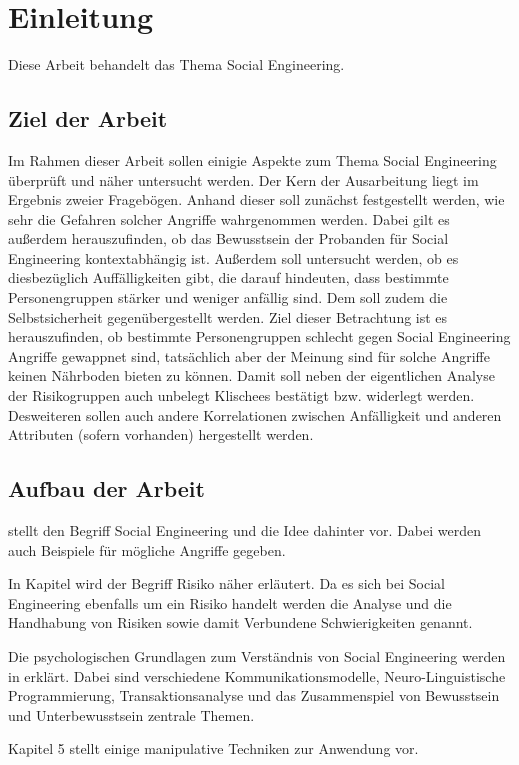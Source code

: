\section{Einleitung}\label{sec:2_einleitung}
Diese Arbeit behandelt das Thema Social Engineering.

\subsection{Ziel der Arbeit}\label{sec:ziel_der_arbeit}
Im Rahmen dieser Arbeit sollen einigie Aspekte zum Thema Social Engineering überprüft und näher untersucht werden.
Der Kern der Ausarbeitung liegt im Ergebnis zweier Fragebögen.
Anhand dieser soll zunächst festgestellt werden, wie sehr die Gefahren solcher Angriffe wahrgenommen werden.
Dabei gilt es außerdem herauszufinden, ob das Bewusstsein der Probanden für Social Engineering kontextabhängig ist.
Außerdem soll untersucht werden, ob es diesbezüglich Auffälligkeiten gibt, die darauf hindeuten, dass bestimmte Personengruppen stärker und weniger anfällig sind.
Dem soll zudem die Selbstsicherheit gegenübergestellt werden.
Ziel dieser Betrachtung ist es herauszufinden, ob bestimmte Personengruppen schlecht gegen Social Engineering Angriffe gewappnet sind, tatsächlich aber der Meinung sind für solche Angriffe keinen Nährboden bieten zu können.
Damit soll neben der eigentlichen Analyse der Risikogruppen auch unbelegt Klischees bestätigt bzw. widerlegt werden.
Desweiteren sollen auch andere Korrelationen zwischen Anfälligkeit und anderen Attributen (sofern vorhanden) hergestellt werden.


\subsection{Aufbau der Arbeit}\label{sec:aufbau_der_arbeit}
 stellt den Begriff Social Engineering und die Idee dahinter vor.
Dabei werden auch Beispiele für mögliche Angriffe gegeben.

In Kapitel  wird der Begriff Risiko näher erläutert.
Da es sich bei Social Engineering ebenfalls um ein Risiko handelt werden die Analyse und die Handhabung
von Risiken sowie damit Verbundene Schwierigkeiten genannt.

Die psychologischen Grundlagen zum Verständnis von Social Engineering werden in
 erklärt.
Dabei sind verschiedene Kommunikationsmodelle, Neuro-Linguistische Programmierung, Transaktionsanalyse
und das Zusammenspiel von Bewusstsein und Unterbewusstsein zentrale Themen.

Kapitel 5 stellt einige manipulative Techniken zur Anwendung vor.